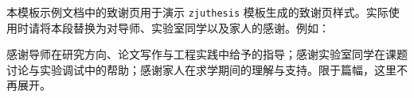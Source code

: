 \cleardoublepage
{}

本模板示例文档中的致谢页用于演示 \texttt{zjuthesis} 模板生成的致谢页样式。实际使用时请将本段替换为对导师、实验室同学以及家人的感谢。例如：

感谢导师在研究方向、论文写作与工程实践中给予的指导；感谢实验室同学在课题讨论与实验调试中的帮助；感谢家人在求学期间的理解与支持。限于篇幅，这里不再展开。
